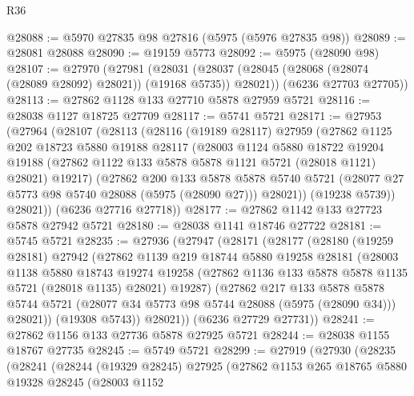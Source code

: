 \begin{lexlean}{R36}
\begin{coremodule}
@28088 := @5970 @27835 @98 @27816 (@5975 (@5976 @27835 @98))
@28089 := @28081 @28088
@28090 := @19159 @5773
@28092 := @5975 (@28090 @98)
@28107 := @27970
    (@27981
      (@28031 (@28037 (@28045 (@28068 (@28074 (@28089 @28092) @28021)) (@19168 @5735)) @28021))
      (@6236 @27703 @27705))
@28113 := @27862 @1128 @133 @27710 @5878 @27959 @5721
@28116 := @28038 @1127 @18725 @27709
@28117 := @5741 @5721
@28171 := @27953
    (@27964
      (@28107
        (@28113
          (@28116
            (@19189 @28117)
            @27959
            (@27862
              @1125
              @202
              @18723
              @5880
              @19188
              @28117
              (@28003
                @1124
                @5880
                @18722
                @19204
                @19188
                (@27862 @1122 @133 @5878 @5878 @1121 @5721 (@28018 @1121) @28021)
                @19217)
              (@27862
                @200
                @133
                @5878
                @5878
                @5740
                @5721
                (@28077 @27 @5773 @98 @5740 @28088 (@5975 (@28090 @27)))
                @28021))
            (@19238 @5739))
          @28021))
      (@6236 @27716 @27718))
@28177 := @27862 @1142 @133 @27723 @5878 @27942 @5721
@28180 := @28038 @1141 @18746 @27722
@28181 := @5745 @5721
@28235 := @27936
    (@27947
      (@28171
        (@28177
          (@28180
            (@19259 @28181)
            @27942
            (@27862
              @1139
              @219
              @18744
              @5880
              @19258
              @28181
              (@28003
                @1138
                @5880
                @18743
                @19274
                @19258
                (@27862 @1136 @133 @5878 @5878 @1135 @5721 (@28018 @1135) @28021)
                @19287)
              (@27862
                @217
                @133
                @5878
                @5878
                @5744
                @5721
                (@28077 @34 @5773 @98 @5744 @28088 (@5975 (@28090 @34)))
                @28021))
            (@19308 @5743))
          @28021))
      (@6236 @27729 @27731))
@28241 := @27862 @1156 @133 @27736 @5878 @27925 @5721
@28244 := @28038 @1155 @18767 @27735
@28245 := @5749 @5721
@28299 := @27919
    (@27930
      (@28235
        (@28241
          (@28244
            (@19329 @28245)
            @27925
            (@27862
              @1153
              @265
              @18765
              @5880
              @19328
              @28245
              (@28003
                @1152

\end{coremodule}
\end{lexlean}
